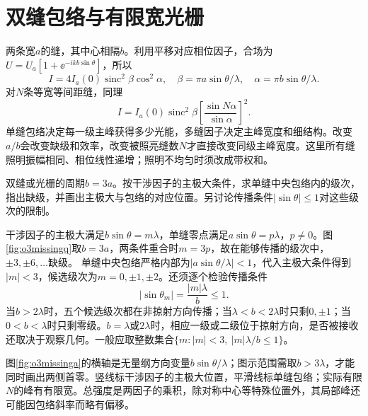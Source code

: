 \section{双缝包络与有限宽光栅}\label{th:o3grating}
两条宽$a$的缝，其中心相隔$b$。利用平移对应相位因子，合场为$U=U_a[1+\ee^{-ikb\sin\theta}]$，所以
\[
 I=4I_a(0)\operatorname{sinc}^2\beta\cos^2\alpha,
 \quad\beta=\pi a\sin\theta/\lambda,\quad
 \alpha=\pi b\sin\theta/\lambda.
\]
对$N$条等宽等间距缝，同理
\begin{equation}\label{eq:o3grating}
 I=I_a(0)\operatorname{sinc}^2\beta
 \left[\frac{\sin N\alpha}{\sin\alpha}\right]^2.
\end{equation}
单缝包络决定每一级主峰获得多少光能，多缝因子决定主峰宽度和细结构。改变$a/b$会改变缺级和效率，改变被照亮缝数$N$才直接改变同级主峰宽度。这里所有缝照明振幅相同、相位线性递增；照明不均匀时须改成带权和。

\begin{example}\label{ex:o3missing}
双缝或光栅的周期$b=3a$。按干涉因子的主极大条件，求单缝中央包络内的级次，指出缺级，并画出主极大与包络的对应位置。另讨论传播条件$|\sin\theta|\le1$对这些级次的限制。
\end{example}
\begin{solution}
干涉因子的主极大满足$b\sin\theta=m\lambda$，单缝零点满足$a\sin\theta=p\lambda$，$p\ne0$。图\ref{fig:o3missingq}取$b=3a$，两条件重合时$m=3p$，故在能够传播的级次中，$\pm3,\pm6,\ldots$缺级。
单缝中央包络严格内部为$|a\sin\theta/\lambda|<1$，代入主极大条件得到$|m|<3$，候选级次为$m=0,\pm1,\pm2$。还须逐个检验传播条件
\[
 |\sin\theta_m|=\frac{|m|\lambda}{b}\le1.
\]
当$b>2\lambda$时，五个候选级次都在非掠射方向传播；当$\lambda<b<2\lambda$时只剩$0,\pm1$；当$0<b<\lambda$时只剩零级。$b=\lambda$或$2\lambda$时，相应一级或二级位于掠射方向，是否被接收还取决于观察几何。一般应取整数集合$\{m:|m|<3,\ |m|\lambda/b\le1\}$。

图\ref{fig:o3missinga}的横轴是无量纲方向变量$b\sin\theta/\lambda$；图示范围需取$b>3\lambda$，才能同时画出两侧首零。竖线标干涉因子的主极大位置，平滑线标单缝包络；实际有限$N$的峰有有限宽。总强度是两因子的乘积，除对称中心等特殊位置外，其局部峰还可能因包络斜率而略有偏移。
\end{solution}

